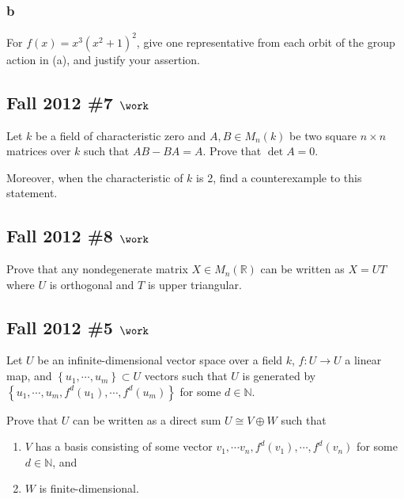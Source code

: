 \hypertarget{b-88}{%
\subsubsection{b}\label{b-88}}

For \(f(x) = x^3(x^2+1)^2\), give one representative from each orbit of
the group action in (a), and justify your assertion.

\hypertarget{fall-2012-7-work}{%
\subsection{\texorpdfstring{Fall 2012 \#7
\(\work\)}{Fall 2012 \#7 \textbackslash work}}\label{fall-2012-7-work}}

Let \(k\) be a field of characteristic zero and \(A, B \in M_n(k)\) be
two square \(n\times n\) matrices over \(k\) such that \(AB - BA = A\).
Prove that \(\det A = 0\).

Moreover, when the characteristic of \(k\) is 2, find a counterexample
to this statement.

\hypertarget{fall-2012-8-work}{%
\subsection{\texorpdfstring{Fall 2012 \#8
\(\work\)}{Fall 2012 \#8 \textbackslash work}}\label{fall-2012-8-work}}

Prove that any nondegenerate matrix \(X\in M_n({\mathbb{R}})\) can be
written as \(X = UT\) where \(U\) is orthogonal and \(T\) is upper
triangular.

\hypertarget{fall-2012-5-work}{%
\subsection{\texorpdfstring{Fall 2012 \#5
\(\work\)}{Fall 2012 \#5 \textbackslash work}}\label{fall-2012-5-work}}

Let \(U\) be an infinite-dimensional vector space over a field \(k\),
\(f: U\to U\) a linear map, and
\(\left\{{u_1, \cdots, u_m}\right\} \subset U\) vectors such that \(U\)
is generated by
\(\left\{{u_1, \cdots, u_m, f^d(u_1), \cdots, f^d(u_m)}\right\}\) for
some \(d\in {\mathbb{N}}\).

Prove that \(U\) can be written as a direct sum \(U \cong V\oplus W\)
such that

\begin{enumerate}
\def\labelenumi{\arabic{enumi}.}
\tightlist
\item
  \(V\) has a basis consisting of some vector
  \(v_1, \cdots v_n, f^d(v_1), \cdots, f^d(v_n)\) for some
  \(d\in {\mathbb{N}}\), and
\item
  \(W\) is finite-dimensional.
\end{enumerate}

